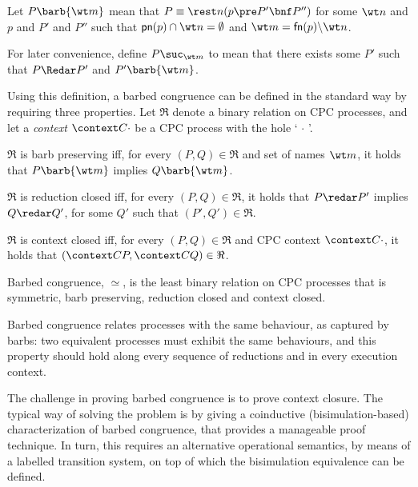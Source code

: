 \documentclass{LMCS}
\renewcommand{\beq}{\simeq}
\begin{document}
\begin{defi}[Barb]
\label{def:barb}
Let $P\barb{\wt m}$ mean that
$P\equiv \rest n (p\pre P'\bnf P'')$
for some $\wt n$ and $p$ and $P'$ and $P''$ such that 
${\sf pn}(p)\cap \wt n = \emptyset$ and $\wt m = {\sf fn}(p) \backslash \wt n$.
\end{defi}

For later convenience, define $P\suc_{\wt m}$ to mean that there exists some $P'$
such that $P\Redar P'$ and $P'\barb{\wt m}$.

Using this definition, a barbed congruence can be defined in the standard way
\cite{milner.sangiorgi:barbed-bisimulation,HY95} by requiring three properties.
Let $\Re$ denote a binary relation on CPC processes, and let a {\em context}
$\context C \cdot$ be a CPC process with the hole `$\,\cdot\,$'.

\begin{defi}
\label{def:barb-pres}
$\Re$ is barb preserving iff, for every $(P,Q) \in \Re$ and set of names  ${\wt m}$, it holds that $P \barb{\wt m}$
implies $Q \barb{\wt m}$.
\end{defi}

\begin{defi}
\label{def:barb-close}
$\Re$ is reduction closed iff, for every $(P,Q) \in \Re$, it holds that $P \redar P'$
implies $Q \redar Q'$, for some $Q'$ such that $(P',Q') \in \Re$.
\end{defi}

\begin{defi}
\label{def:cont-close}
$\Re$ is context closed iff, for every $(P,Q) \in \Re$ and CPC context
$\context C \cdot$, 
it holds that $(\context C P, \context C Q) \in \Re$.
\end{defi}

\begin{defi}
\label{def:barb-con}
Barbed congruence, $\beq$, is the least binary relation on CPC processes that is symmetric, barb preserving, reduction closed and
context closed.
\end{defi}

Barbed congruence relates processes with the same
behaviour, as captured by barbs: two equivalent processes must exhibit the same behaviours, 
and this property should hold along every sequence of reductions and in every execution context.

The challenge in proving barbed congruence is to prove
context closure.  The typical way of solving the problem is by giving
a coinductive (bisimulation-based) characterization of barbed
congruence, that provides a manageable proof technique. In turn, this
requires an alternative operational semantics, by means of a labelled
transition system, on top of which the bisimulation equivalence can be
defined.
\end{document}
